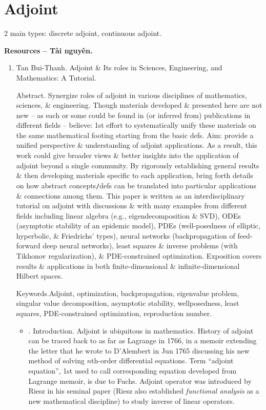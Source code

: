\documentclass{article}
\begin{document}

\section{Adjoint}
2 main types: discrete adjoint, continuous adjoint.

\noindent\textbf{\textsf{Resources -- Tài nguyên.}}
\begin{enumerate}
	\item {\sc Tan Bui-Thanh}. {\sc Adjoint \& Its roles in Sciences, Engineering, and Mathematics: A Tutorial}.
	
	{\sf Abstract.} Synergize roles of adjoint in various disciplines of mathematics, sciences, \& engineering. Though materials developed \& presented here are not new -- as each or some could be found in (or inferred from) publications in different fields -- believe: 1st effort to systematically unify these materials on the same mathematical footing starting from the basic defs. Aim: provide a unified perspective \& understanding of adjoint applications. As a result, this work could give broader views \& better insights into the application of adjoint beyond a single community. By rigorously establishing general results \& then developing materials specific to each application, bring forth details on how abstract concepts{\tt/}defs can be translated into particular applications \& connections among them. This paper is written as an interdisciplinary tutorial on adjoint with discussions \& with many examples from different fields including linear algebra (e.g., eigendecomposition \& SVD), ODEs (asymptotic stability of an epidemic model), PDEs (well-posedness of elliptic, hyperbolic, \& Friedrichs' types), neural networks (backpropagation of feed-forward deep neural networks), least squares \& inverse problems (with Tikhonov regularization), \& PDE-constrained optimization. Exposition covers results \& applications in both finite-dimensional \& infinite-dimensional Hilbert spaces.
	
	{\sf Keywords.}Adjoint, optimization, backpropagation, eigenvalue problem, singular value decomposition, asymptotic stability, wellposedness, least squares, PDE-constrained optimization, reproduction number.
	\begin{itemize}
		\item {. Introduction.} Adjoint is ubiquitous in mathematics. History of adjoint can be traced back to as far as {\sc Lagrange} in 1766, in a memoir extending the letter that he wrote to {\sc D'Alembert} in Jun 1765 discussing his new method of solving $n$th-order differential equations. Term ``adjoint equation'', 1st used to call corresponding equation developed from Lagrange memoir, is due to {\sc Fuchs}. Adjoint operator was introduced by {\sc Riesz} in his seminal paper ({\sc Riesz} also established {\it functional analysis} as a new mathematical discipline) to study inverse of linear operators.
		

\end{itemize}
\end{enumerate}
\end{document}
